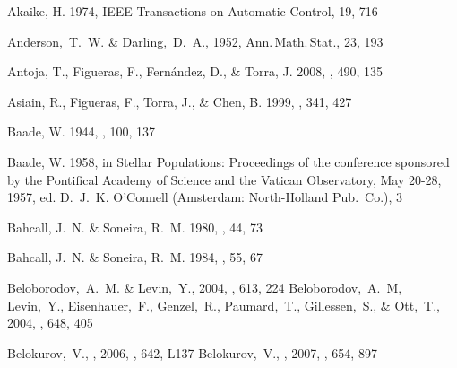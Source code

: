\begin{thebibliography}{99}
{Akaike}, H. 1974, {IEEE Transactions on Automatic Control}, 19, 716

  Anderson,~T.~W. \& Darling,~D.~A., 1952,
  Ann.\,Math.\,Stat., 23, 193

{Antoja}, T., {Figueras}, F., {Fern{\'a}ndez}, D., \& {Torra}, J. 2008, \aap,
  490, 135

{Asiain}, R., {Figueras}, F., {Torra}, J., \& {Chen}, B. 1999, \aap, 341, 427

{Baade}, W. 1944, \apj, 100, 137

{Baade}, W. 1958, in {Stellar Populations: Proceedings of the conference
  sponsored by the Pontifical Academy of Science and the Vatican Observatory,
  May 20-28, 1957}, ed. D.~J.~K. {O'Connell} ({Amsterdam}: {North-Holland
  Pub.~Co.}), 3

{Bahcall}, J.~N. \& {Soneira}, R.~M. 1980, \apjs, 44, 73

{Bahcall}, J.~N. \& {Soneira}, R.~M. 1984, \apjs, 55, 67

  Beloborodov,~A.~M. \& Levin,~Y., 2004,
  \apj, 613, 224
  Beloborodov,~A.~M, Levin,~Y., Eisenhauer,~F., Genzel,~R., 
  Paumard,~T., Gillessen,~S.,
  \& Ott,~T., 2004,
  \apj, 648, 405

  Belokurov,~V., \etal, 2006,
  \apjl, 642, L137
  Belokurov,~V., \etal, 2007,
  \apj, 654, 897


\end{thebibliography}
